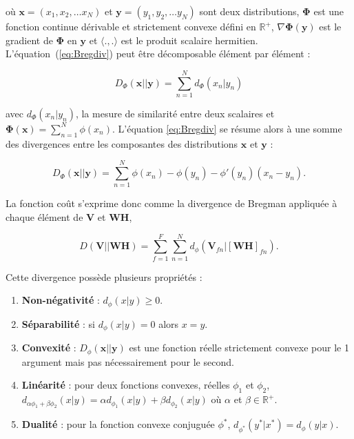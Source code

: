 où  $\mathbf{x} = (x_1, x_2, \dots x_N)$ et $\mathbf{y} = (y_1, y_2, \dots y_N)$ sont deux distributions, $\mathbf{\Phi}$ est une fonction continue dérivable et strictement convexe défini en $\mathbb{R}^+$, $\nabla\mathbf{\Phi}(\mathbf{y})$ est le gradient de $\mathbf{\Phi}$ en $\mathbf{y}$ et $\langle .,.\rangle$ est le produit scalaire hermitien. L'équation~(\ref{eq:Bregdiv}) peut être décomposable élément par élément : 

\begin{equation}
D_{\Phi}(\mathbf{x}\vert\vert \mathbf{y}) = \sum_{n=1}^N d_{\Phi}(x_n\vert y_n)
\end{equation}

avec $d_{\Phi}(x_n\vert y_n)$, la mesure de similarité entre deux scalaires et $\mathbf{\Phi(x)} = \sum_{n=1}^N \phi(x_n)$. L'équation \ref{eq:Bregdiv} se résume alors à une somme des divergences entre les composantes des distributions $\mathbf{x}$ et $\mathbf{y}$ :

\begin{equation}\label{eq:divBregWise}
D_{\Phi}(\textbf{x}\vert\vert \textbf{y}) = \sum_{n=1}^N \phi(x_n)-\phi(y_n)-\phi'(y_n)(x_n-y_n).
\end{equation}

La fonction coût s'exprime donc comme la divergence de Bregman appliquée à chaque élément de $\mathbf{V}$ et $\mathbf{WH}$, 

\begin{equation}\label{eq:similarite2}
D\left(\textbf{V} \vert\vert \textbf{WH} \right) = \sum_{f = 1}^{F} \sum_{n = 1}^{N} d_{\phi}
\left(\textbf{V}_{fn} \vert \left[ \textbf{WH} \right]_{fn} \right).
\end{equation}


Cette divergence possède plusieurs propriétés : 

\begin{enumerate}
\item \textbf{Non-négativité} : $d_{\phi}(x\vert y) \geq 0$.

\item \textbf{Séparabilité} : si $d_{\phi}(x\vert y) = 0$ alors $x = y$.

\item \textbf{Convexité} : $D_{\phi}(\textbf{x}\vert\vert \textbf{y})$ est une fonction réelle strictement convexe pour le 1\ier{} argument mais pas nécessairement pour le second.

\item \textbf{Linéarité} : pour deux fonctions convexes, réelles $\phi_1$ et $\phi_2$,  $d_{\alpha \phi_1 + \beta \phi_2}(x\vert y) = \alpha d_{\phi_1}(x\vert y)+\beta d_{\phi_2}(x\vert y)$ où $\alpha$ et $\beta \in \mathbb{R}^+$.

\item \textbf{Dualité} : pour la fonction convexe conjuguée $\phi^{\ast}$, $d_{\phi^{\ast}}(y^{\ast}\vert x^{\ast}) = d_{\phi}(y \vert x)$.
\end{enumerate}

